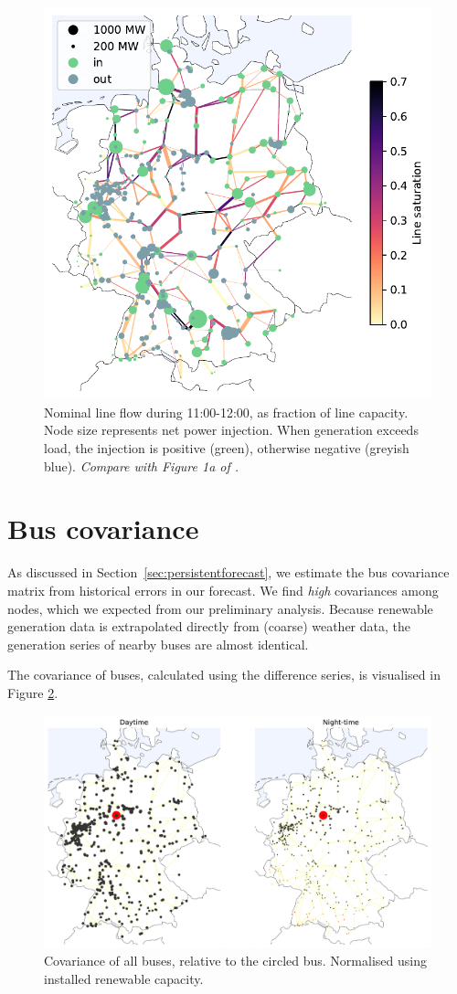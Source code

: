 \documentclass[main.tex]{subfiles}
\begin{document}
\begin{figure}[ht]
    \centering
    \includegraphics[width=.6\textwidth]{img/nominal_flow_and_injection.pdf}
    \caption{
    \label{fig:nominalflowandinjection}Nominal line flow during 11:00-12:00, as fraction of line capacity. Node size represents net power injection. When generation exceeds load, the injection is positive (green), otherwise negative (greyish blue). \emph{Compare with Figure 1a of \cite{Nesti2018emergentfailures}.}}
\end{figure}

\section{Bus covariance}
As discussed in Section~\ref{sec:persistentforecast}, we estimate the bus covariance matrix from historical errors in our forecast. We find \emph{high} covariances among nodes, which we expected from our preliminary analysis. Because renewable generation data is extrapolated directly from (coarse) weather data, the generation series of nearby buses are almost identical. 

The covariance of buses, calculated using the difference series, is visualised in Figure \ref{fig:buscov}. 
\begin{figure}[ht]
    \centering
    \includegraphics[width=\textwidth]{img/bus_correlation_123_fullcov_day_and_night.pdf}
    \caption{
    \label{fig:buscov}Covariance of all buses, relative to the circled bus. Normalised using installed renewable capacity.}
\end{figure}
\end{document}
